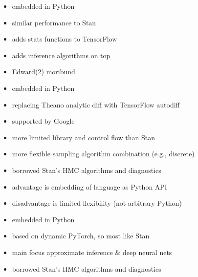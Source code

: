 \documentclass[10pt]{report}
\begin{document}
\begin{itemize}
\item embedded in Python
\item similar performance to Stan
\item adds stats functions to TensorFlow
\item adds inference algorithms on top
\item Edward(2) moribund
\end{itemize}

\begin{itemize}
\item embedded in Python
\item replacing Theano analytic diff with TensorFlow autodiff
\item supported by Google
\item more limited library and control flow than Stan
\item more flexible sampling algorithm combination (e.g., discrete)
\item borrowed Stan's HMC algorithms and diagnostics
\item {advantage} is {embedding of language} as Python API
\item {disadvantage} is {limited flexibility} (not arbitrary Python)
\end{itemize}

\begin{itemize}
\item embedded in Python
\item based on dynamic PyTorch, so most like Stan
\item main focus approximate inference \& deep neural nets
\item borrowed Stan's HMC algorithms and diagnostics
\end{itemize}
\end{document}
